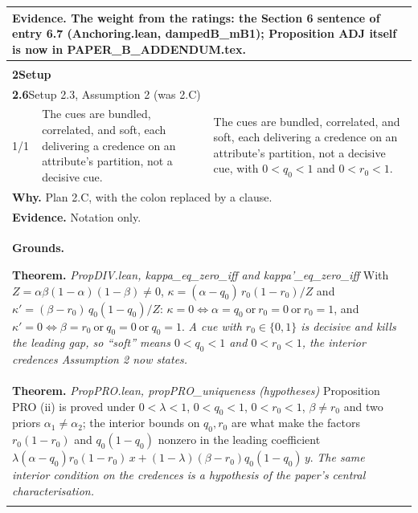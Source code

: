 \documentclass[10pt]{article}
\theoremstyle{definition}
\newlength{\fullw}\setlength{\fullw}{25.9cm}
\newcommand{\entryhead}[2]{\multicolumn{3}{|l|}{\rule{0pt}{2.6ex}\large\textbf{#1}\quad #2} \\ \hline}
\begin{document}
{\begin{longtable}{|p{0.9cm}|p{12.2cm}|p{12.2cm}|}
\multicolumn{3}{|p{\fullw}|}{\textbf{Evidence.} The weight from the ratings: the Section 6 sentence of entry 6.7 (Anchoring.lean, dampedB\_mB1); Proposition ADJ itself is now in PAPER\_B\_ADDENDUM.tex.} \\ \hline
\multicolumn{3}{|l|}{} \\ \hline
\multicolumn{3}{|l|}{\rule{0pt}{3.2ex}\Large\textbf{2\quad Setup}} \\ \hline\hline
\entryhead{2.6}{Setup 2.3, Assumption 2 (was 2.C)\quad{\footnotesize\textit{(formerly E.4)}}}
1/1 & The cues are bundled, correlated, and soft, each delivering a credence on an attribute's partition, not a decisive cue. & The cues are bundled, correlated, and soft, each delivering a credence on an attribute's partition, not a decisive cue, with $0<q_0<1$ and $0<r_0<1$. \\ \hline
\multicolumn{3}{|p{\fullw}|}{\textbf{Why.} Plan 2.C, with the colon replaced by a clause.} \\
\multicolumn{3}{|p{\fullw}|}{\textbf{Evidence.} Notation only.} \\ \hline
\multicolumn{3}{|p{\fullw}|}{\textbf{Grounds.}\par \textbf{Theorem.} \textit{PropDIV.lean, kappa\_eq\_zero\_iff and kappa'\_eq\_zero\_iff} \newline With $Z=\alpha\beta(1-\alpha)(1-\beta)\neq0$,
$\kappa=(\alpha-q_0)\,r_0(1-r_0)/Z$ and $\kappa'=(\beta-r_0)\,q_0(1-q_0)/Z$:
$\kappa=0 \iff \alpha=q_0 \ \text{or}\ r_0=0 \ \text{or}\ r_0=1$, and
$\kappa'=0 \iff \beta=r_0 \ \text{or}\ q_0=0 \ \text{or}\ q_0=1$. \newline \textit{A cue with $r_0\in\{0,1\}$ is decisive and kills the leading gap, so ``soft'' means
$0<q_0<1$ and $0<r_0<1$, the interior credences Assumption 2 now states.}} \\
\multicolumn{3}{|p{\fullw}|}{\textbf{Theorem.} \textit{PropPRO.lean, propPRO\_uniqueness (hypotheses)} \newline Proposition PRO (ii) is proved under $0<\lambda<1$, $0<q_0<1$, $0<r_0<1$,
$\beta\neq r_0$ and two priors $\alpha_1\neq\alpha_2$; the interior bounds on $q_0,r_0$
are what make the factors $r_0(1-r_0)$ and $q_0(1-q_0)$ nonzero in the leading
coefficient $\lambda(\alpha-q_0)r_0(1-r_0)\,x+(1-\lambda)(\beta-r_0)q_0(1-q_0)\,y$. \newline \textit{The same interior condition on the credences is a hypothesis of the paper's
central characterisation.}} \\ \hline
\multicolumn{3}{|l|}{} \\ \hline

\end{longtable}}
\end{document}
